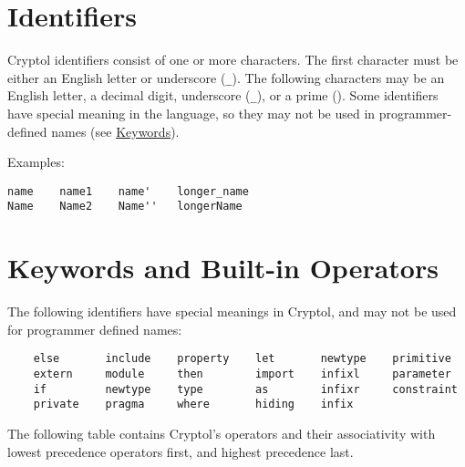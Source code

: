 \hypertarget{identifiers}{%
\section{Identifiers}\label{identifiers}}

Cryptol identifiers consist of one or more characters. The first
character must be either an English letter or underscore (\texttt{\_}).
The following characters may be an English letter, a decimal digit,
underscore (\texttt{\_}), or a prime (\texttt{\textquotesingle{}}). Some
identifiers have special meaning in the language, so they may not be
used in programmer-defined names (see
\protect\hyperlink{keywords-and-built-in-operators}{Keywords}).

Examples:

\begin{verbatim}
name    name1    name'    longer_name
Name    Name2    Name''   longerName
\end{verbatim}

\hypertarget{keywords-and-built-in-operators}{%
\section{Keywords and Built-in
Operators}\label{keywords-and-built-in-operators}}

The following identifiers have special meanings in Cryptol, and may not
be used for programmer defined names:

\begin{verbatim}
    else       include    property    let       newtype    primitive
    extern     module     then        import    infixl     parameter
    if         newtype    type        as        infixr     constraint
    private    pragma     where       hiding    infix
\end{verbatim}

The following table contains Cryptol's operators and their associativity
with lowest precedence operators first, and highest precedence last.

